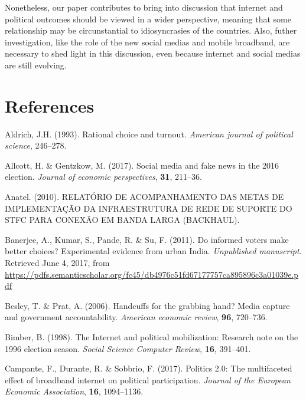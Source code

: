 \documentclass[12pt,]{article}
\begin{document}
Nonetheless, our paper contributes to bring into discussion that
internet and political outcomes should be viewed in a wider perspective,
meaning that some relationship may be circunstantial to idiosyncrasies
of the countries. Also, futher investigation, like the role of the new
social medias and mobile broadband, are necessary to shed light in this
discussion, even because internet and social medias are still evolving.

\hypertarget{references}{%
\section*{References}\label{references}}

\hypertarget{refs}{}
\leavevmode\hypertarget{ref-aldrich_rational_1993}{}%
Aldrich, J.H. (1993). Rational choice and turnout. \emph{American
journal of political science}, 246--278.

\leavevmode\hypertarget{ref-allcott_social_2017}{}%
Allcott, H. \& Gentzkow, M. (2017). Social media and fake news in the
2016 election. \emph{Journal of economic perspectives}, \textbf{31},
211--36.

\leavevmode\hypertarget{ref-anatel_relatorio_2010}{}%
Anatel. (2010). RELATÓRIO DE ACOMPANHAMENTO DAS METAS DE IMPLEMENTAÇÃO
DA INFRAESTRUTURA DE REDE DE SUPORTE DO STFC PARA CONEXÃO EM BANDA LARGA
(BACKHAUL).

\leavevmode\hypertarget{ref-banerjee_informed_2011}{}%
Banerjee, A., Kumar, S., Pande, R. \& Su, F. (2011). Do informed voters
make better choices? Experimental evidence from urban India.
\emph{Unpublished manuscript}. Retrieved June 4, 2017, from
\url{https://pdfs.semanticscholar.org/fc45/db4976c51fd67177757ca895896c3a01039e.pdf}

\leavevmode\hypertarget{ref-besley_handcuffs_2006}{}%
Besley, T. \& Prat, A. (2006). Handcuffs for the grabbing hand? Media
capture and government accountability. \emph{American economic review},
\textbf{96}, 720--736.

\leavevmode\hypertarget{ref-bimber_internet_1998}{}%
Bimber, B. (1998). The Internet and political mobilization: Research
note on the 1996 election season. \emph{Social Science Computer Review},
\textbf{16}, 391--401.

\leavevmode\hypertarget{ref-campante_politics_2017}{}%
Campante, F., Durante, R. \& Sobbrio, F. (2017). Politics 2.0: The
multifaceted effect of broadband internet on political participation.
\emph{Journal of the European Economic Association}, \textbf{16},
1094--1136.
\end{document}
